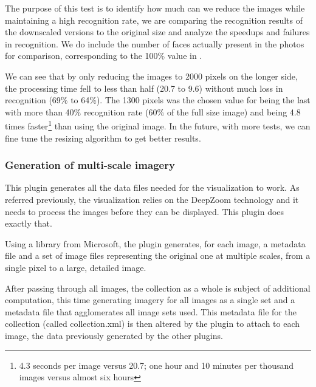 The purpose of this test is to identify how much can we reduce the images while maintaining a high recognition rate, we are comparing the recognition results of the downscaled versions to the original size and analyze the speedups and failures in recognition. We do include the number of faces actually present in the photos for comparison, corresponding to the 100\% value in .

We can see that by only reducing the images to 2000 pixels on the longer side, the processing time fell to less than half (20.7 to 9.6) without much loss in recognition (69\% to 64\%). The 1300 pixels was the chosen value for being the last with more than 40\% recognition rate (60\% of the full size image) and being 4.8 times faster\footnote{4.3 seconds per image versus 20.7; one hour and 10 minutes per thousand images versus almost six hours} than using the original image. In the future, with more tests, we can fine tune the resizing algorithm to get better results.





\subsubsection{Generation of multi-scale imagery}

This plugin generates all the data files needed for the visualization to work. As referred previously, the visualization relies on the DeepZoom technology and it needs to process the images before they can be displayed. This plugin does exactly that.


Using a library from Microsoft, the plugin generates, for each image, a metadata file and a set of image files representing the original one at multiple scales, from a single pixel to a large, detailed image.

After passing through all images, the collection as a whole is subject of additional computation, this time generating imagery for all images as a single set and a metadata file that agglomerates all image sets used. This metadata file for the collection (called collection.xml) is then altered by the plugin to attach to each image, the data previously generated by the other plugins.

